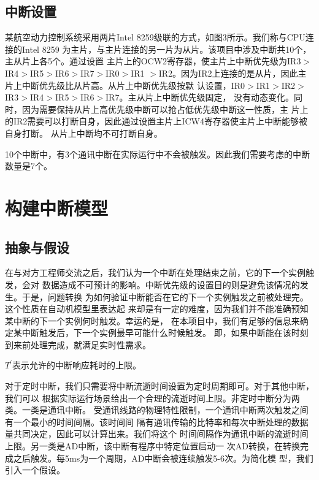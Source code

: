 \subsection{中断设置}
\label{subsec:intr_setting}

某航空动力控制系统采用两片Intel 8259级联的方式，如图3所示。我们称与CPU连接的Intel 8259
为主片，与主片连接的另一片为从片。该项目中涉及中断共10个，主从片上各5个。通过设置
主片上的OCW2寄存器，使主片上中断优先级为IR3$>$IR4$>$IR5$>$IR6$>$IR7$>$IR0$>$IR1
$>$IR2。因为IR2上连接的是从片，因此主片上中断优先级比从片高。从片上中断优先级按默
认设置，IR0$>$IR1$>$IR2$>$IR3$>$IR4$>$IR5$>$IR6$>$IR7。主从片上中断优先级固定，
没有动态变化。同时，因为需要保持从片上高优先级中断可以抢占低优先级中断这一性质，主
片上的IR2需要可以打断自身，因此通过设置主片上ICW4寄存器使主片上中断能够被自身打断。
从片上中断均不可打断自身。

10个中断中，有3个通讯中断在实际运行中不会被触发。因此我们需要考虑的中断数量是7个。

\section{构建中断模型}
\label{sec:build}

\subsection{抽象与假设}
\label{subsec:abstract_ass}

在与对方工程师交流之后，我们认为一个中断在处理结束之前，它的下一个实例触发，会对
数据造成不可预计的影响。中断优先级的设置目的则是避免该情况的发生。于是，问题转换
为如何验证中断能否在它的下一个实例触发之前被处理完。这个性质在自动机模型里表达起
来却是有一定的难度，因为我们并不能准确预知某中断的下一个实例何时触发。幸运的是，
在本项目中，我们有足够的信息来确定某中断触发后，下一个实例最早可能什么时候触发。
即，如果中断能在该时刻到来前处理完成，就满足实时性需求。

\begin{definition}
	$T^\prime$表示允许的中断响应耗时的上限。
	\label{def:T_prime}
\end{definition}

对于定时中断，我们只需要将中断流逝时间设置为定时周期即可。对于其他中断，我们可以
根据实际运行场景给出一个合理的流逝时间上限。非定时中断分为两类。一类是通讯中断。
受通讯线路的物理特性限制，一个通讯中断两次触发之间有一个最小的时间间隔。该时间间
隔有通讯传输的比特率和每次中断处理的数据量共同决定，因此可以计算出来。我们将这个
时间间隔作为通讯中断的流逝时间上限。另一类是AD中断，该中断有程序中特定位置启动一
次AD转换，在转换完成之后触发。每5ms为一个周期，AD中断会被连续触发5-6次。为简化模
型，我们引入一个假设。

